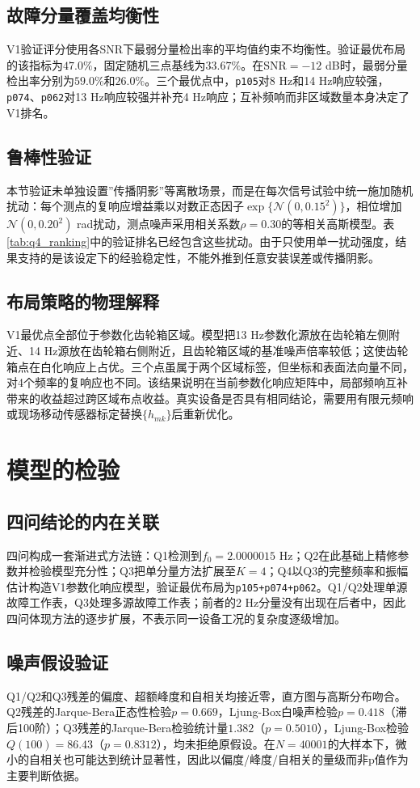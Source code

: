 \documentclass[withoutpreface,bwprint]{cumcmthesis}
\begin{document}
\subsection{故障分量覆盖均衡性}
V1验证评分使用各SNR下最弱分量检出率的平均值约束不均衡性。验证最优布局的该指标为$47.0\%$，固定随机三点基线为$33.67\%$。在SNR$=-12$ dB时，最弱分量检出率分别为$59.0\%$和$26.0\%$。三个最优点中，\texttt{p105}对8 Hz和14 Hz响应较强，\texttt{p074}、\texttt{p062}对13 Hz响应较强并补充4 Hz响应；互补频响而非区域数量本身决定了V1排名。

\subsection{鲁棒性验证}
本节验证未单独设置”传播阴影”等离散场景，而是在每次信号试验中统一施加随机扰动：每个测点的复响应增益乘以对数正态因子$\exp\{\mathcal N(0,0.15^2)\}$，相位增加$\mathcal N(0,0.20^2)$ rad扰动，测点噪声采用相关系数$\rho=0.30$的等相关高斯模型。表\ref{tab:q4_ranking}中的验证排名已经包含这些扰动。由于只使用单一扰动强度，结果支持的是该设定下的经验稳定性，不能外推到任意安装误差或传播阴影。

\subsection{布局策略的物理解释}
V1最优点全部位于参数化齿轮箱区域。模型把13 Hz参数化源放在齿轮箱左侧附近、14 Hz源放在齿轮箱右侧附近，且齿轮箱区域的基准噪声倍率较低；这使齿轮箱点在白化响应上占优。三个点虽属于两个区域标签，但坐标和表面法向量不同，对4个频率的复响应也不同。该结果说明在当前参数化响应矩阵中，局部频响互补带来的收益超过跨区域布点收益。真实设备是否具有相同结论，需要用有限元频响或现场移动传感器标定替换$\{h_{mk}\}$后重新优化。

\section{模型的检验}
\subsection{四问结论的内在关联}
四问构成一套渐进式方法链：Q1检测到$f_0=2.0000015$ Hz；Q2在此基础上精修参数并检验模型充分性；Q3把单分量方法扩展至$K=4$；Q4以Q3的完整频率和振幅估计构造V1参数化响应模型，验证最优布局为\texttt{p105+p074+p062}。Q1/Q2处理单源故障工作表，Q3处理多源故障工作表；前者的2 Hz分量没有出现在后者中，因此四问体现方法的逐步扩展，不表示同一设备工况的复杂度逐级增加。

\subsection{噪声假设验证}
Q1/Q2和Q3残差的偏度、超额峰度和自相关均接近零，直方图与高斯分布吻合。Q2残差的Jarque-Bera正态性检验$p=0.669$，Ljung-Box白噪声检验$p=0.418$（滞后100阶）；Q3残差的Jarque-Bera检验统计量$1.382$（$p=0.5010$），Ljung-Box检验$Q(100)=86.43$（$p=0.8312$），均未拒绝原假设。在$N=40001$的大样本下，微小的自相关也可能达到统计显著性，因此以偏度/峰度/自相关的量级而非p值作为主要判断依据。
\end{document}
